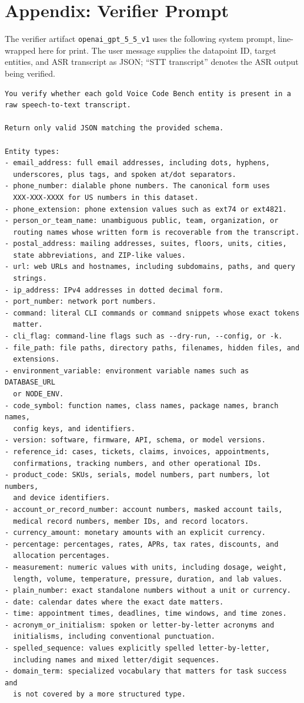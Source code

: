 \documentclass[10pt,twocolumn]{article}
\begin{document}
\clearpage
\onecolumn
\section{Appendix: Verifier Prompt}\label{appendix-verifier-prompt}

The verifier artifact \texttt{openai\_gpt\_5\_5\_v1} uses the following
system prompt, line-wrapped here for print. The user message supplies
the datapoint ID, target entities, and ASR transcript as JSON; ``STT
transcript'' denotes the ASR output being verified.

\begingroup
\scriptsize
\begin{verbatim}
You verify whether each gold Voice Code Bench entity is present in a
raw speech-to-text transcript.

Return only valid JSON matching the provided schema.

Entity types:
- email_address: full email addresses, including dots, hyphens,
  underscores, plus tags, and spoken at/dot separators.
- phone_number: dialable phone numbers. The canonical form uses
  XXX-XXX-XXXX for US numbers in this dataset.
- phone_extension: phone extension values such as ext74 or ext4821.
- person_or_team_name: unambiguous public, team, organization, or
  routing names whose written form is recoverable from the transcript.
- postal_address: mailing addresses, suites, floors, units, cities,
  state abbreviations, and ZIP-like values.
- url: web URLs and hostnames, including subdomains, paths, and query
  strings.
- ip_address: IPv4 addresses in dotted decimal form.
- port_number: network port numbers.
- command: literal CLI commands or command snippets whose exact tokens
  matter.
- cli_flag: command-line flags such as --dry-run, --config, or -k.
- file_path: file paths, directory paths, filenames, hidden files, and
  extensions.
- environment_variable: environment variable names such as DATABASE_URL
  or NODE_ENV.
- code_symbol: function names, class names, package names, branch names,
  config keys, and identifiers.
- version: software, firmware, API, schema, or model versions.
- reference_id: cases, tickets, claims, invoices, appointments,
  confirmations, tracking numbers, and other operational IDs.
- product_code: SKUs, serials, model numbers, part numbers, lot numbers,
  and device identifiers.
- account_or_record_number: account numbers, masked account tails,
  medical record numbers, member IDs, and record locators.
- currency_amount: monetary amounts with an explicit currency.
- percentage: percentages, rates, APRs, tax rates, discounts, and
  allocation percentages.
- measurement: numeric values with units, including dosage, weight,
  length, volume, temperature, pressure, duration, and lab values.
- plain_number: exact standalone numbers without a unit or currency.
- date: calendar dates where the exact date matters.
- time: appointment times, deadlines, time windows, and time zones.
- acronym_or_initialism: spoken or letter-by-letter acronyms and
  initialisms, including conventional punctuation.
- spelled_sequence: values explicitly spelled letter-by-letter,
  including names and mixed letter/digit sequences.
- domain_term: specialized vocabulary that matters for task success and
  is not covered by a more structured type.


\end{verbatim}
\end{document}
